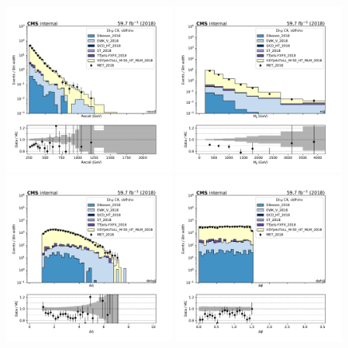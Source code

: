 \begin{figure}[htbp]
    \begin{center}
        \includegraphics[width=0.49\textwidth]{fig/datamc/cr_2m_vbf/cr_2m_vbf_recoil_losf_2018.pdf}
        \includegraphics[width=0.49\textwidth]{fig/datamc/cr_2m_vbf/cr_2m_vbf_mjj_losf_2018.pdf} \\
        \includegraphics[width=0.49\textwidth]{fig/datamc/cr_2m_vbf/cr_2m_vbf_detajj_losf_2018.pdf}
        \includegraphics[width=0.49\textwidth]{fig/datamc/cr_2m_vbf/cr_2m_vbf_dphijj_losf_2018.pdf}

\end{center}
\end{figure}
